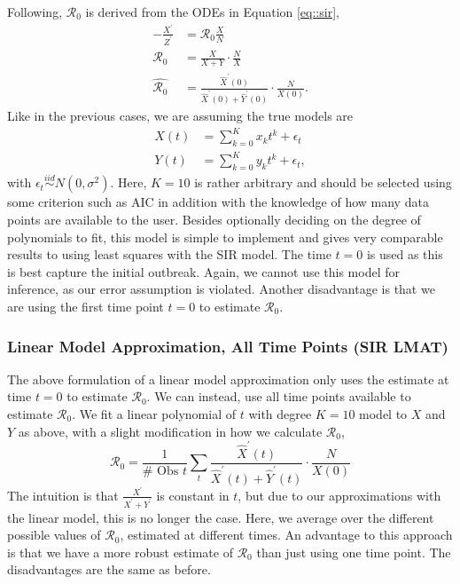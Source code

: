 \documentclass[12pt]{article}
\newcommand{\rr}{\ensuremath{\mathcal{R}_0}}
\begin{document}
Following,  \(\rr\) is derived from the ODEs in Equation \eqref{eq::sir},
\begin{align}
  - \frac{X^\prime}{Z^\prime}&= \rr \frac{X}{N}\\
\rr &=       \frac{X}{ X + Y} \cdot \frac{N}{X}\\
  \hat{\rr} &= \frac{\hat{X}^\prime(0)}{ \hat{X}^\prime(0) + \hat{Y}^\prime(0)} \cdot \frac{N}{X(0)}.
  \end{align}
Like in the previous cases, we are assuming the true models are
\begin{align*}
X(t) &= \sum_{k=0}^K x_k t^k + \epsilon_t\\
  {Y}(t) &= \sum_{k=0}^K y_k t^k + \epsilon_t,
\end{align*}
with $\epsilon_t \overset{iid}{\sim} N(0, \sigma^2)$.  Here, $K=10$ is rather arbitrary and should be selected using some criterion such as AIC in addition with the knowledge of how many data points are available to the user.  Besides optionally deciding on the degree of polynomials to fit, this model is simple to implement and gives very comparable results to using least squares with the SIR model.  The time $t=0$ is used as this is best capture the initial outbreak.  Again, we cannot use this model for inference, as our error assumption is violated.  Another disadvantage is that we are using the first time point $t=0$ to estimate $\rr$.  

\subsubsection{Linear Model Approximation, All Time Points (SIR LMAT)}\label{linear-model-approximation-all-time-points-degree-10}

The above formulation of a linear model approximation only uses the estimate at time $t=0$ to estimate $\rr$.  We can instead, use all time points available to estimate $\rr$.  We fit a linear polynomial of \(t\) with degree \(K= 10\) model to \(X\)
and \(Y\) as above, with a slight modification in how we calculate
\(\rr\),
\[\rr = \frac{1}{\# \text{ Obs }t}\sum_t \frac{\hat{X}^\prime(t)}{ \hat{X}^\prime(t) + \hat{Y}^\prime(t)} \cdot \frac{N}{X(0)} \]
The intuition is that $\frac{X^\prime}{X^\prime + Y^\prime}$ is constant in $t$, but due to our approximations with the linear model, this is no longer the case.  Here, we average over the different possible values of $\rr$, estimated at different times.  An advantage to this approach is that we have a more robust estimate of $\rr$ than just using one time point.  The disadvantages are the same as before.
\end{document}
